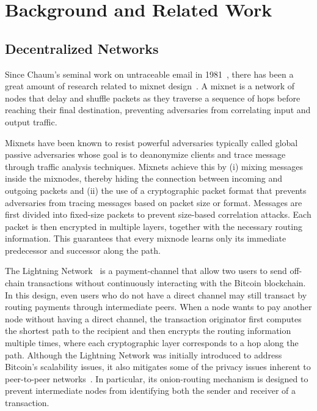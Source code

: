 \section{Background and Related Work}\label{sec:related}

\subsection{Decentralized Networks}
Since Chaum's seminal work on untraceable email in 1981~\cite{chaum-mix}, there has been a great amount of research related to mixnet design~\cite{piotrowska2017loopix, van2015vuvuzela, kwon2020xrd, lazar2018karaoke, cottrell1995mixmaster, alexopoulos2017MCMIX, chaum2016cmix, chaum-mix, danezis2003mixminion}. 
A mixnet is a network of nodes that delay and shuffle packets as they traverse a sequence of hops before reaching their final destination, preventing adversaries from correlating input and output traffic.

Mixnets have been known to resist powerful adversaries typically called global passive adversaries whose goal is to deanonymize clients and trace message through traffic analysis techniques. 
Mixnets achieve this by (i) mixing messages inside the mixnodes, thereby hiding the connection between incoming and outgoing packets and (ii) the use of a cryptographic packet format that prevents adversaries from tracing messages based on packet size or format. 
Messages are first divided into fixed-size packets to prevent size-based correlation attacks. 
Each packet is then encrypted in multiple layers, together with the necessary routing information. 
This guarantees that every mixnode learns only its immediate predecessor and successor along the path.

The Lightning Network~\cite{poon2016bitcoin} is a payment-channel that allow two users to send off-chain transactions without continuously interacting with the Bitcoin blockchain. 
In this design, even users who do not have a direct channel may still transact by routing payments through intermediate peers. 
When a node wants to pay another node without having a direct channel, the transaction originator first computes the shortest path to the recipient and then encrypts the routing information multiple times, where each cryptographic layer corresponds to a hop along the path.
Although the Lightning Network was initially introduced to address Bitcoin's scalability issues, it also mitigates some of the privacy issues inherent to peer-to-peer networks~\cite{sharma2022anonymity}. 
In particular, its onion-routing mechanism is designed to prevent intermediate nodes from identifying both the sender and receiver of a transaction.

